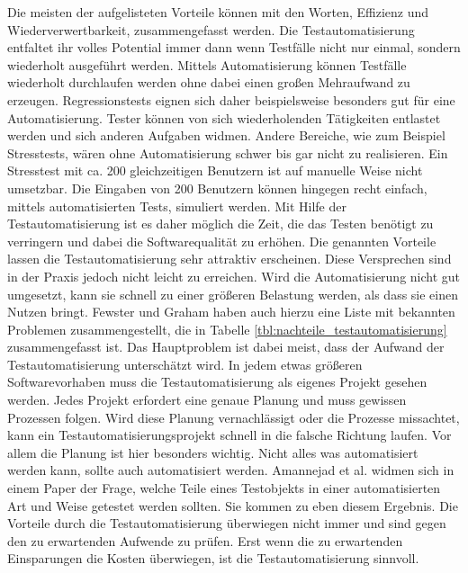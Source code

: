 Die meisten der aufgelisteten Vorteile können mit den Worten, Effizienz und Wiederverwertbarkeit, zusammengefasst werden.
Die Testautomatisierung entfaltet ihr volles Potential immer dann wenn Testfälle nicht nur einmal, sondern wiederholt ausgeführt werden. Mittels Automatisierung können Testfälle wiederholt durchlaufen werden ohne dabei einen großen Mehraufwand zu erzeugen. Regressionstests eignen sich daher beispielsweise besonders gut für eine Automatisierung. Tester können von sich wiederholenden Tätigkeiten entlastet werden und sich anderen Aufgaben widmen. Andere Bereiche, wie zum Beispiel Stresstests, wären ohne Automatisierung schwer bis gar nicht zu realisieren. Ein Stresstest mit ca. 200 gleichzeitigen Benutzern ist auf manuelle Weise nicht umsetzbar. Die Eingaben von 200 Benutzern können hingegen recht einfach, mittels automatisierten Tests, simuliert werden.
Mit Hilfe der Testautomatisierung ist es daher möglich die Zeit, die das Testen benötigt zu verringern und dabei die Softwarequalität zu erhöhen. \newline
Die genannten Vorteile lassen die Testautomatisierung sehr attraktiv erscheinen. Diese Versprechen sind in der Praxis jedoch nicht leicht zu erreichen. Wird die Automatisierung nicht gut umgesetzt, kann sie schnell zu einer größeren Belastung werden, als dass sie einen Nutzen bringt.
Fewster und Graham haben auch hierzu eine Liste mit bekannten Problemen zusammengestellt, \cite{fewster_software_1999} die in Tabelle \ref{tbl:nachteile_testautomatisierung} zusammengefasst ist.
Das Hauptproblem ist dabei meist, dass der Aufwand der Testautomatisierung unterschätzt wird. In jedem etwas größeren Softwarevorhaben muss die Testautomatisierung als eigenes Projekt gesehen werden. Jedes Projekt erfordert eine genaue Planung und muss gewissen Prozessen folgen. Wird diese Planung vernachlässigt oder die Prozesse missachtet, kann ein Testautomatisierungsprojekt schnell in die falsche Richtung laufen.
Vor allem die Planung ist hier besonders wichtig. Nicht alles was automatisiert werden kann, sollte auch automatisiert werden.
Amannejad et al. \cite{amannejad_search-based_2014} widmen sich in einem Paper der Frage, welche Teile eines Testobjekts in einer automatisierten Art und Weise getestet werden sollten. Sie kommen zu eben diesem Ergebnis. Die Vorteile durch die Testautomatisierung überwiegen nicht immer und sind gegen den zu erwartenden Aufwende zu prüfen. Erst wenn die zu erwartenden Einsparungen die Kosten überwiegen, ist die Testautomatisierung sinnvoll.



